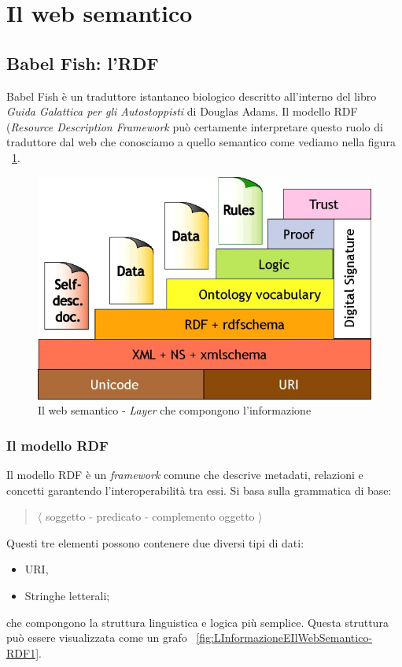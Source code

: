 	\section{Il web semantico}
	
		\subsection{Babel Fish: l'RDF}
			Babel Fish è un traduttore istantaneo biologico descritto all'interno del libro \emph{Guida Galattica per gli Autostoppisti} di Douglas Adams. Il modello RDF (\emph{Resource Description Framework} può certamente interpretare questo ruolo di traduttore dal web che conosciamo a quello semantico come vediamo nella figura ~\ref{fig:LInformazioneEIlWebSemantico-WebSemantico}.
			
			\begin{figure}
				\centering
				\includegraphics[scale=0.5]{images/LInformazioneEIlWebSemantico-WebSemantico1}
				\caption{Il web semantico - \emph{Layer} che compongono l'informazione}
				\label{fig:LInformazioneEIlWebSemantico-WebSemantico}
			\end{figure}			
			
			\subsubsection{Il modello RDF}
				Il modello RDF è un \emph{framework} comune che descrive metadati, relazioni e concetti garantendo l'interoperabilità tra essi. Si basa sulla grammatica di base:
				\begin{quote}
					$\langle$ soggetto - predicato - complemento oggetto $\rangle$
				\end{quote}
				Questi tre elementi possono contenere due diversi tipi di dati:
					\begin{itemize}
						\item URI,
						\item Stringhe letterali;
					\end{itemize}
				che compongono la struttura linguistica e logica più semplice. Questa struttura può essere visualizzata come un grafo ~\ref{fig:LInformazioneEIlWebSemantico-RDF1}.
				

